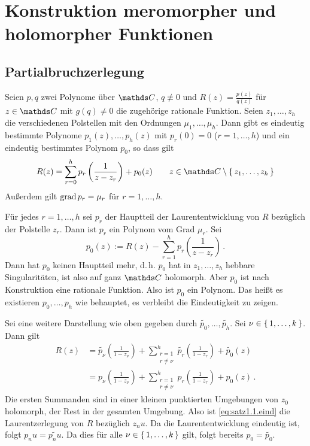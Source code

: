 
\chapter{Konstruktion meromorpher und holomorpher Funktionen}

\section{Partialbruchzerlegung}
\begin{satz}
Seien $p, q$ zwei Polynome über $\CC$, $q \not\equiv 0$ und $R(z) = \frac{p(z)}{q(z)}$ für $z\in\CC$ mit $g(q)\not=0$ die zugehörige rationale Funktion.
Seien $z_1, \ldots, z_h$ die verschiedenen Polstellen mit den Ordnungen $\mu_1,\ldots, \mu_h$.
Dann gibt es eindeutig bestimmte Polynome $p_1(z), \ldots, p_h(z)$ mit $p_r(0) = 0$ ($r=1,\ldots,h$) und ein eindeutig bestimmtes Polynom $p_0$, so dass gilt
\[
	R(z) = \sum_{r=0}^h p_r\left(\frac{1}{z-z_r}\right) + p_0(z) \qquad z \in \CC\setminus\Set{z_1, \ldots, z_h}
\]
Außerdem gilt $\operatorname{grad} p_r = \mu_r$ für $r=1,\ldots,h$.
\end{satz}

\begin{bewe}
Für jedes $r=1,\ldots,h$ sei $p_r$ der Hauptteil der Laurententwicklung von $R$ bezüglich der Polstelle $z_r$.
Dann ist $p_r$ ein Polynom vom Grad $\mu_r$.
Sei
\[
	p_0(z) := R(z) - \sum_{r=1}^h p_r\left(\frac{1}{z-z_r}\right)\,.
\]
Dann hat $p_0$ keinen Hauptteil mehr, d.\,h. $p_0$ hat in $z_1,\ldots,z_h$ hebbare Singularitäten, ist also auf ganz $\CC$ holomorph.
Aber $p_0$ ist nach Konstruktion eine rationale Funktion.
Also ist $p_0$ ein Polynom.
Das heißt es existieren $p_0, \ldots, p_h$ wie behauptet, es verbleibt die Eindeutigkeit zu zeigen.

Sei eine weitere Darstellung wie oben gegeben durch $\tilde{p_0}, \ldots, \tilde{p_h}$.
Sei $\nu \in \left\{\,1,\ldots,k\,\right\}$.
Dann gilt
\begin{align}\label{eq:satz1.1.eind}
	R(z)
	&= \tilde{p_\nu}\left(\frac{1}{1-z_\nu}\right) + \sum_{\substack{r=1\\\scriptscriptstyle r\not=\nu}}^h \tilde{p_r}\left(\frac{1}{1-z_r}\right) + \tilde{p_0}(z) \\
	&= p_\nu\left(\frac{1}{1-z_\nu}\right) + \sum_{\substack{r=1\\\scriptscriptstyle r\not=\nu}}^h p_r\left(\frac{1}{1-z_r}\right) + p_0(z)
	\,. \nonumber
\end{align}
Die ersten Summanden sind in einer kleinen punktierten Umgebungen von $z_0$ holomorph, der Rest in der gesamten Umgebung.
Also ist \eqref{eq:satz1.1.eind} die Laurentzerlegung von $R$ bezüglich $z_nu$.
Da die Laurententwicklung eindeutig ist, folgt $p_nu = \tilde{p_nu}$.
Da dies für alle $\nu \in \left\{\,1,\ldots,k\,\right\}$ gilt, folgt bereits $p_0 = \tilde{p_0}$.
\end{bewe}

